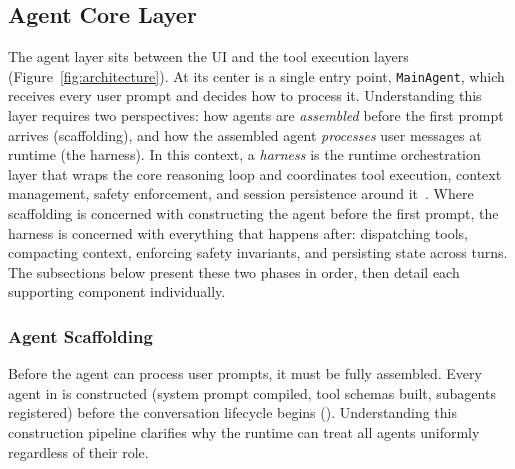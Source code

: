 \subsection{Agent Core Layer}
\label{sec:agent_core}

The agent layer sits between the UI and the tool execution layers (Figure~\ref{fig:architecture}). At its center is a single entry point, \texttt{MainAgent}, which receives every user prompt and decides how to process it. Understanding this layer requires two perspectives: how agents are \emph{assembled} before the first prompt arrives (scaffolding), and how the assembled agent \emph{processes} user messages at runtime (the harness). In this context, a \emph{harness} is the runtime orchestration layer that wraps the core reasoning loop and coordinates tool execution, context management, safety enforcement, and session persistence around it~\cite{anthropic2025harness}. Where scaffolding is concerned with constructing the agent before the first prompt, the harness is concerned with everything that happens after: dispatching tools, compacting context, enforcing safety invariants, and persisting state across turns. The subsections below present these two phases in order, then detail each supporting component individually.


\subsubsection{Agent Scaffolding}
\label{sec:agent_scaffolding}

Before the agent can process user prompts, it must be fully assembled. Every agent in \name is constructed (system prompt compiled, tool schemas built, subagents registered) before the conversation lifecycle begins (). Understanding this construction pipeline clarifies why the runtime can treat all agents uniformly regardless of their role.

